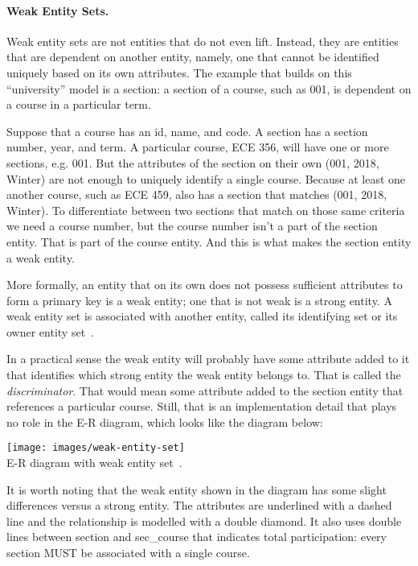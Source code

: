 \paragraph{Weak Entity Sets.} Weak entity sets are not entities that do not even lift. Instead, they are entities that are dependent on another entity, namely, one that cannot be identified uniquely based on its own attributes. The example that builds on this ``university'' model is a section: a section of a course, such as 001, is dependent on a course in a particular term. 

Suppose that a course has an id, name, and code. A section has a section number, year, and term. A particular course, ECE 356, will have one or more sections, e.g. 001. But the attributes of the section on their own (001, 2018, Winter) are not enough to uniquely identify a single course. Because at least one another course, such as ECE 459, also has a section that matches (001, 2018, Winter). To differentiate between two sections that match on those same criteria we need a course number, but the course number isn't a part of the section entity. That is part of the course entity. And this is what makes the section entity a weak entity.

More formally, an entity that on its own does not possess sufficient attributes to form a primary key is a weak entity; one that is not weak is a strong entity. A weak entity set is associated with another entity, called its identifying set or its owner entity set~\cite{dsc}.

In a practical sense the weak entity will probably have some attribute added to it that identifies which strong entity the weak entity belongs to. That is called the \textit{discriminator}. That would mean some attribute added to the section entity that references a particular course. Still, that is an implementation detail that plays no role in the E-R diagram, which looks like the diagram below:

\begin{center}
\texttt{[image: images/weak-entity-set]}\\
E-R diagram with weak entity set~\cite{dsc}.
\end{center}

It is worth noting that the weak entity shown in the diagram has some slight differences versus a strong entity. The attributes are underlined with a dashed line and the relationship is modelled with a double diamond. It also uses double lines between section and sec\_course that indicates total participation: every section MUST be associated with a single course.

